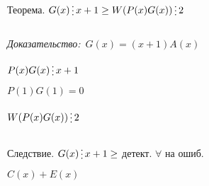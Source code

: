 \documentclass[12pt]{article}
\begin{document}
    Теорема. $G(x) \mathop{\raisebox{-2pt}{\vdots}} x+1 \geq W(P(x)G(x)) \mathop{\raisebox{-2pt}{\vdots}} 2$\par
    $ $\par
    \textit{Доказательство:} $\, G(x) = (x+1)A(x)$\par
    $P(x)G(x) \mathop{\raisebox{-2pt}{\vdots}} x+1$\par
    $P(1)G(1) = 0$\par
    $W(P(x)G(x)) \mathop{\raisebox{-2pt}{\vdots}} 2$\par
    $ $\par
    Следствие. $G(x) \mathop{\raisebox{-2pt}{\vdots}} x+1 \geq$ детект. $\forall$ на ошиб.\par
    $C(x)+E(x)$\par
\end{document}
